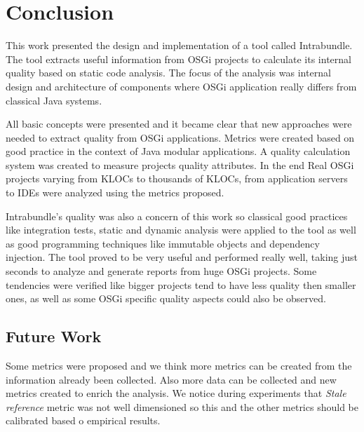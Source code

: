 \chapter{Conclusion}
This work presented the design and implementation of a tool called Intrabundle. The tool extracts useful information from OSGi projects to calculate its internal quality based on static code analysis. The focus of the analysis was internal design and architecture of components where OSGi application really differs from classical Java systems. 

All basic concepts were presented and it became clear that new approaches were needed to extract quality from OSGi applications. Metrics were created based on good practice in the context of Java modular applications. A quality calculation system was created to measure projects quality attributes. In the end Real OSGi projects varying from KLOCs to thousands of KLOCs, from application servers to IDEs were analyzed using the metrics proposed.

Intrabundle's quality was also a concern of this work so classical good practices like integration tests, static and dynamic analysis were applied to the tool as well as good programming techniques like immutable objects and dependency injection.      
The tool proved to be very useful and performed really well, taking just seconds to analyze and generate reports from huge OSGi projects. Some tendencies were verified like bigger projects tend to have less quality then smaller ones, as well as some OSGi specific quality aspects could also be observed.



\section{Future Work}
Some metrics were proposed and we think more metrics can be created from the information already been collected. Also more data can be collected and new metrics created to enrich the analysis. We notice during experiments that \emph{Stale reference} metric was not well dimensioned so this and the other metrics should be calibrated based o empirical results.

